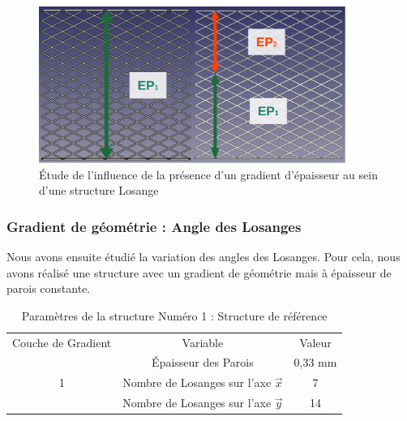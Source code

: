 \documentclass[a4paper]{article}
\begin{document}
	\begin{figure}[H]
		\centering
		\includegraphics[width=10cm]{Images/6/gradep/gradep.pdf}
		\caption{Étude de l’influence de la présence d'un gradient d'épaisseur au sein d'une structure Losange}
		\label{grad_ep}
	\end{figure}
	\newpage
	
	\subsubsection{Gradient de géométrie : Angle des Losanges}
	\label{grad_geom_partie}
	\hspace{0.5cm}Nous avons ensuite étudié la variation des angles des Losanges. Pour cela, nous avons réalisé une structure avec un gradient de géométrie mais à épaisseur de parois constante.
	
	\begin{table}[H]
		\centering
		\begin{tabular}{|c|c|c|}
			\hline
			\rowcolor{Gray}
			\multicolumn{3}{c}{Structure de Référence : Structure 1}\\\hline
			\rowcolor{Gray}
			Couche de Gradient & Variable & Valeur\\
			\hline\hline
			& \textcolor[rgb]{0,0.5,0}{Épaisseur des Parois} & \textcolor[rgb]{0,0.5,0}{0,33 mm}\\
			\textcolor[rgb]{0,0.5,0}{1} & \textcolor[rgb]{0,0.5,0}{Nombre de Losanges sur l'axe $\vec{x}$} & \textcolor[rgb]{0,0.5,0}{7}\\
			& \textcolor[rgb]{0,0.5,0}{Nombre de Losanges sur l'axe $\vec{y}$} & \textcolor[rgb]{0,0.5,0}{14}\\
			\hline
		\end{tabular}
		\caption{Paramètres de la structure Numéro 1 : Structure de référence}
	\end{table}
	
\end{document}
